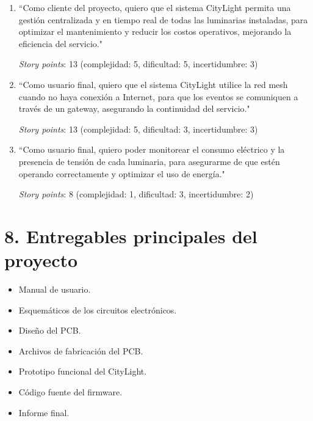 \documentclass[
11pt, %
]{charter}
\begin{document}
\begin{enumerate}
\item ``Como cliente del proyecto, quiero que el sistema CityLight permita una gestión centralizada y en tiempo real de todas las luminarias instaladas, para optimizar el mantenimiento y reducir los costos operativos, mejorando la eficiencia del servicio."

\textit{Story points}: 13 (complejidad: 5, dificultad: 5, incertidumbre: 3)

\item ``Como usuario final, quiero que el sistema CityLight utilice la red mesh cuando no haya conexión a Internet, para que los eventos se comuniquen a través de un gateway, asegurando la continuidad del servicio."

\textit{Story points}: 13 (complejidad: 5, dificultad: 3, incertidumbre: 3)

\item ``Como usuario final, quiero poder monitorear el consumo eléctrico y la presencia de tensión de cada luminaria, para asegurarme de que estén operando correctamente y 
optimizar el uso de energía."

\textit{Story points}: 8 (complejidad: 1, dificultad: 3, incertidumbre: 2)



\end{enumerate}



\section{8. Entregables principales del proyecto}
\label{sec:entregables}

\begin{itemize}
	\item Manual de usuario.
	\item Esquemáticos de los circuitos electrónicos.
	\item Diseño del PCB.
	\item Archivos de fabricación del PCB.
	\item Prototipo funcional del CityLight.
	\item Código fuente del firmware.
	\item Informe final.
\end{itemize}
\end{document}
